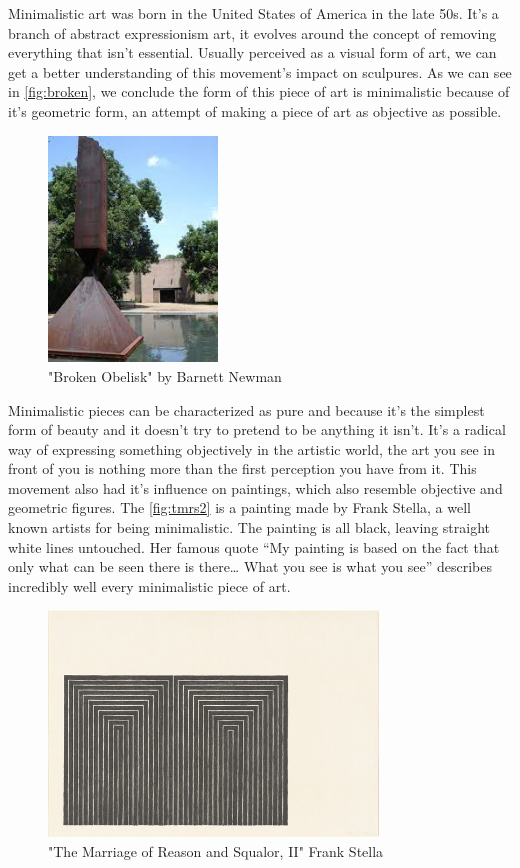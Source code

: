 \documentclass{report}
\begin{document}
Minimalistic art was born in the United States of America in the late 50s. It's a branch of abstract expressionism art, it evolves around the concept of removing everything that isn't essential. Usually perceived as a visual form of art, we can get a better understanding of this movement's impact on sculpures. As we can see in \autoref{fig:broken}, we conclude the form of this piece of art is minimalistic because of it's geometric form, an attempt of making a piece of art as objective as possible.

	\begin{figure}[h]
	\center
	\includegraphics[height=6cm]{img/broken1}
	\caption{"Broken Obelisk" by Barnett Newman}
	\label{fig:broken}
	\end{figure}	
		
Minimalistic pieces can be characterized as pure and because it's the simplest form of beauty and it doesn't try to pretend to be anything it isn't. It's a radical way of expressing something objectively in the artistic world, the art you see in front of you is nothing more than the first perception you have from it.
This movement also had it's influence on paintings, which also resemble objective and geometric figures. 
The \autoref{fig:tmrs2} is a painting made by Frank Stella, a well known artists for being minimalistic. The painting is all black, leaving straight white lines untouched. Her famous quote “My painting is based on the fact that only what can be seen there is there… What you see is what you see” describes incredibly well every minimalistic piece of art. 
	
	\begin{figure}[h]
	\center
	\includegraphics[height=6cm]{img/trms2}
	\caption{"The Marriage of Reason and Squalor, II" Frank Stella}
	\label{fig:tmrs2}
	\end{figure}	
		
\end{document}
